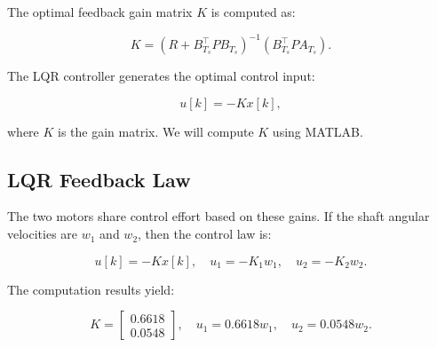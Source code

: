 The optimal feedback gain matrix \( K \) is computed as:

\[
K = \left( R + B_{T_s}^\top P B_{T_s} \right)^{-1} \left(B_{T_s}^\top P A_{T_s} \right).
\]

The LQR controller generates the optimal control input:

\[
u[k] = -K x[k],
\]

where \( K \) is the gain matrix. We will compute \( K \) using MATLAB.

\subsection*{LQR Feedback Law}
The two motors share control effort based on these gains. If the shaft angular velocities are \( w_{1} \) and \( w_{2} \), then the control law is:

\[
u[k] = -K x[k], \quad u_{1} = -K_{1} w_{1}, \quad u_{2} = -K_{2} w_{2}.
\]

The computation results yield:

\[
K = \begin{bmatrix}
0.6618 \\ 0.0548
\end{bmatrix}, \quad u_{1} = 0.6618 w_{1}, \quad u_{2} = 0.0548 w_{2}.
\]
